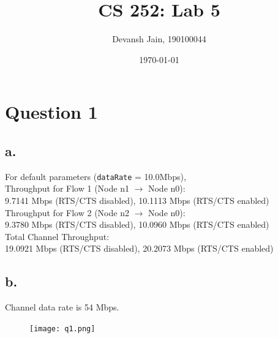 \documentclass[11pt, fleqn]{article}
\title{\vspace{-4em}CS 252: Lab 5}
\author{Devansh Jain, 190100044}
\date{\today}
\begin{document}
\maketitle
\tableofcontents
\thispagestyle{empty}
\setcounter{page}{0}


\newpage 
\section*{Question 1}
\setcounter{equation}{0}

\subsection*{a.}

For default parameters (\texttt{dataRate} = 10.0Mbps),\\

Throughput for Flow 1 (Node n1 $\rightarrow$ Node n0): \\
9.7141 Mbps (RTS/CTS disabled), 10.1113 Mbps (RTS/CTS enabled) \\

Throughput for Flow 2 (Node n2 $\rightarrow$ Node n0): \\
9.3780 Mbps (RTS/CTS disabled), 10.0960 Mbps (RTS/CTS enabled) \\

Total Channel Throughput: \\
19.0921 Mbps (RTS/CTS disabled), 20.2073 Mbps (RTS/CTS enabled) \\

\subsection*{b.}

Channel data rate is 54 Mbps.

\begin{figure}[H]
    \centering
    \texttt{[image: q1.png]}
\end{figure}
\end{document}
